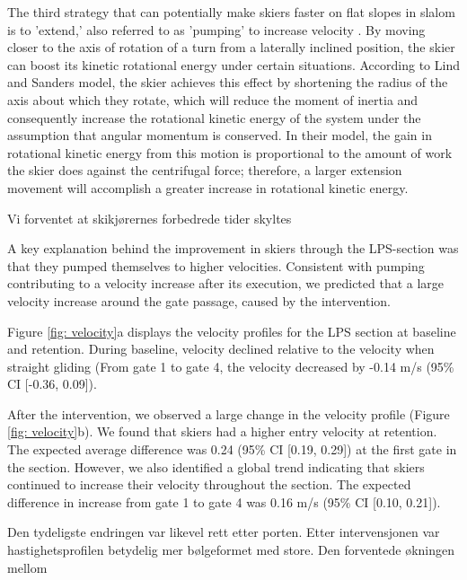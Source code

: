 \documentclass{article}
\begin{document}
The third strategy that can potentially make skiers faster on flat slopes in slalom is to 'extend,' also referred to as 'pumping' to increase velocity \cite{lind_physics_2013}. By moving closer to the axis of rotation of a turn from a laterally inclined position, the skier can boost its kinetic rotational energy under certain situations. According to Lind and Sanders \cite{lind_physics_2013} model, the skier achieves this effect by shortening the radius of the axis about which they rotate, which will reduce the moment of inertia and consequently increase the rotational kinetic energy of the system under the assumption that angular momentum is conserved. In their model, the gain in rotational kinetic energy from this motion is proportional to the amount of work the skier does against the centrifugal force; therefore, a larger extension movement will accomplish a greater increase in rotational kinetic energy.



Vi forventet at skikjørernes forbedrede tider skyltes 



A key explanation behind the improvement in skiers through the LPS-section was that they pumped themselves to higher velocities. Consistent with pumping contributing to a velocity increase after its execution, we predicted that a large velocity increase around the gate passage, caused by the intervention.

Figure \ref{fig: velocity}a displays the velocity profiles for the LPS section at baseline and retention. During baseline, velocity declined relative to the velocity when straight gliding (From gate 1 to gate 4, the velocity decreased by -0.14 m/s (95\% CI [-0.36, 0.09]).

After the intervention, we observed a large change in the velocity profile (Figure \ref{fig: velocity}b). We found that skiers had a higher entry velocity at retention. The expected average difference was 0.24 (95\% CI [0.19, 0.29]) at the first gate in the section. However, we also identified a global trend indicating that skiers continued to increase their velocity throughout the section. The expected difference in increase from gate 1 to gate 4 was 0.16 m/s (95\% CI [0.10, 0.21]).

Den tydeligste endringen var likevel rett etter porten. Etter intervensjonen var hastighetsprofilen betydelig mer bølgeformet med store. Den forventede økningen mellom
\end{document}
